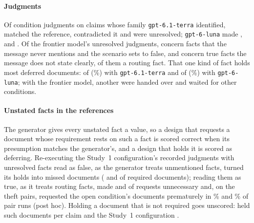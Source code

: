\paragraph{Judgments}
Of \jaTotal{} condition judgments on claims whose family \texttt{gpt-6.1-terra} identified, \jaCorrect{} matched the reference, \jaFlipped{} contradicted it and \jaUnres{} were unresolved; \texttt{gpt-6-luna} made \jaLunaCorrect, \jaLunaFlipped{} and \jaLunaUnres. Of the frontier model's unresolved judgments, \jaUnresFalse{} concern facts that the message never mentions and the scenario sets to false, and \jaUnresTrue{} concern true facts the message does not state clearly, \jaUnresRouting{} of them a routing fact. That one kind of fact holds most deferred documents:  of  (\%) with \texttt{gpt-6.1-terra} and  of  (\%) with \texttt{gpt-6-luna}; with the frontier model, another  were handed over and  waited for other conditions.

\paragraph{Unstated facts in the references}
The generator gives every unstated fact a value, so a design that requests a document whose requirement rests on such a fact is scored correct when its presumption matches the generator's, and a design that holds it is scored as deferring. Re-executing the Study~1 configuration's recorded judgments with unresolved facts read as false, as the generator treats unmentioned facts, turned its holds into missed documents (\pct{\tvTerraClosedMiss} and \pct{\tvLunaClosedMiss} of required documents); reading them as true, as it treats routing facts, made \pct{\tvTerraEagerUnnec} and \pct{\tvLunaEagerUnnec} of requests unnecessary and, on the theft pairs, requested the open condition's documents prematurely in \tvThTerraEagerPremature\% and \tvThLunaEagerPremature\% of pair runs (post hoc). Holding a document that is not required goes unscored:  held \tenTerraBoneHoldsNonreq{} such documents per claim and the Study~1 configuration \tenTerraCPxHoldsNonreq.

